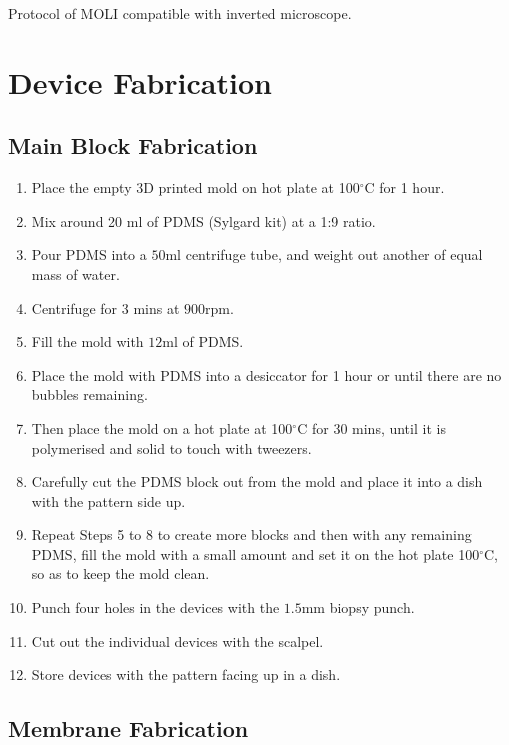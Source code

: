 Protocol of MOLI compatible with inverted microscope.

\section{Device Fabrication}

\subsection*{Main Block Fabrication}

\begin{enumerate}
	  \setlength\itemsep{-0.1em}
	\item Place the empty 3D printed mold on hot plate at 100$^{\circ}$C for 1 hour.
	\item Mix around 20 ml of PDMS (Sylgard kit) at a 1:9 ratio. 
	\item Pour PDMS into a $50  \text{ml}$ centrifuge tube, and weight out another of equal mass of water.
	\item Centrifuge for 3 mins at $900  \text{rpm}$. 
	\item Fill the mold with $12  \text{ml}$ of PDMS.
	\item Place the mold with PDMS into a desiccator for 1 hour or until there are no bubbles remaining.
	\item Then place the mold on a hot plate at 100$^{\circ}$C for 30 mins, until it is polymerised and solid to touch with tweezers. 
	\item Carefully cut the PDMS block out from the mold and place it into a dish with the pattern side up.
	\item Repeat Steps 5 to 8 to create more blocks and then with any remaining PDMS, fill the mold with a small amount and set it on the hot plate 100$^{\circ}$C, so as to keep the mold clean.
	\item Punch four holes in the devices with the $1.5  \text{mm}$ biopsy punch.
	\item Cut out the individual devices with the scalpel.
	\item Store devices with the pattern facing up in a dish.
\end{enumerate}

\subsection*{Membrane Fabrication}

